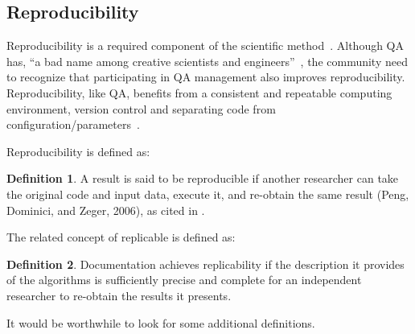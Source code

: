 \documentclass[letterpaper,cleveref]{lipics-v2019}
\theoremstyle{definition}
\newtheorem{defn}{Definition}
\begin{document}
\subsection{Reproducibility}

Reproducibility is a required component of the scientific
method~\cite{Davison2012}.  Although QA has, ``a bad name among creative
scientists and engineers''~\cite[p.~352]{Roache1998}, the community need to
recognize that participating in QA management also improves reproducibility.
Reproducibility, like QA, benefits from a consistent and repeatable computing
environment, version control and separating code from
configuration/parameters~\cite{Davison2012}.

Reproducibility is defined as:

\begin{defn}
A result is said to be reproducible if another researcher can take the original
code and input data, execute it, and re-obtain the same result (Peng, Dominici,
and Zeger, 2006), as cited in \citet{BenureauAndRougier2017}.
\end{defn}

The related concept of replicable is defined as:

\begin{defn}
Documentation achieves replicability if the description it provides of the
algorithms is sufficiently precise and complete for an independent researcher to
re-obtain the results it presents.  \citep{BenureauAndRougier2017}
\end{defn}

It would be worthwhile to look for some additional definitions.
\end{document}
